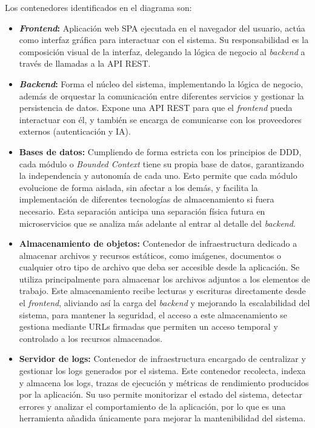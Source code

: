 Los contenedores identificados en el diagrama son:
\begin{itemize}
  \item \textbf{\emph{Frontend}:} Aplicación web \ac{SPA} ejecutada en el navegador del usuario, actúa como interfaz gráfica para interactuar con el sistema. Su responsabilidad es la composición visual de la interfaz, delegando la lógica de negocio al \emph{backend} a través de llamadas a la API REST.
  \item \textbf{\emph{Backend}:} Forma el núcleo del sistema, implementando la lógica de negocio, además de orquestar la comunicación entre diferentes servicios y gestionar la persistencia de datos. Expone una API REST para que el \emph{frontend} pueda interactuar con él, y también se encarga de comunicarse con los proveedores externos (autenticación y \ac{IA}).
  \item \textbf{Bases de datos:} Cumpliendo de forma estricta con los principios de \ac{DDD}, cada módulo o \emph{Bounded Context} tiene su propia base de datos, garantizando la independencia y autonomía de cada uno. Esto permite que cada módulo evolucione de forma aislada, sin afectar a los demás, y facilita la implementación de diferentes tecnologías de almacenamiento si fuera necesario. Esta separación anticipa una separación física futura en microservicios que se analiza más adelante al entrar al detalle del \emph{backend}.
  \item \textbf{Almacenamiento de objetos:} Contenedor de infraestructura dedicado a almacenar archivos y recursos estáticos, como imágenes, documentos o cualquier otro tipo de archivo que deba ser accesible desde la aplicación. Se utiliza principalmente para almacenar los archivos adjuntos a los elementos de trabajo. Este almacenamiento recibe lecturas y escrituras directamente desde el \emph{frontend}, aliviando así la carga del \emph{backend} y mejorando la escalabilidad del sistema, para mantener la seguridad, el acceso a este almacenamiento se gestiona mediante URLs firmadas que permiten un acceso temporal y controlado a los recursos almacenados.
  \item \textbf{Servidor de logs:} Contenedor de infraestructura encargado de centralizar y gestionar los logs generados por el sistema. Este contenedor recolecta, indexa y almacena los logs, trazas de ejecución y métricas de rendimiento producidos por la aplicación. Su uso permite monitorizar el estado del sistema, detectar errores y analizar el comportamiento de la aplicación, por lo que es una herramienta añadida únicamente para mejorar la mantenibilidad del sistema.
\end{itemize}

